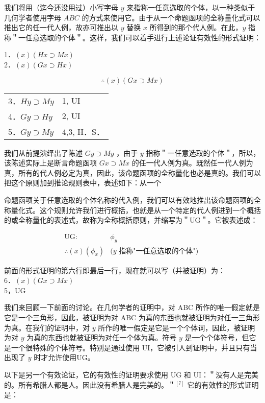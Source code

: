 我们将用（迄今还没用过）小写字母 $y$ 来指称一任意选取的个体，以一种类似于几何学者使用字母 $A B C$ 的方式来使用它。由于从一个命题函项的全称量化式可以推出它的任一代人例，故亦可推出以 $y$ 替换 $x$ 所得到的那个代人例。在此，$y$ 指称＂一任意选取的个体＂。这样，我们可以着手进行上述论证有效性的形式证明：

1．$(x)(H x \supset M x)$\\
2．$(x)(G x \supset H x)$

$$
\therefore(x)(G x \supset M x)
$$

\begin{center}
\begin{tabular}{ll}
3．$H y \supset M y$ & 1, UI \\
4．$G y \supset H y$ & 2, UI \\
5．$G y \supset M y$ & 4,3, H．S． \\
\end{tabular}
\end{center}

我们从前提演绎出了陈述 $G y \supset M y$ ，由于 $y$ 指称＂一任意选取的个体＂，所以，该陈述实际上是断言命题函项 $G x \supset M x$ 的任一代人例为真。既然任一代人例为真，所有的代人例必定为真，因此，该命题函项的全称量化也必是真的。我们可以把这个原则加到推论规则表中，表述如下：从一个

命题函项关于任意选取的个体名称的代入例，我们可以有效地推出该命题函项的全称量化式。这个规则允许我们进行概括，也就是从一个特定的代人例进到一个概括的或全称量化的表述式，故称为全称概括原则，并缩写为＂UG＂。它被表述成：

$$
\begin{aligned}
\mathrm{UG}: & \phi_{y} \\
\therefore(x)\left(\phi_{x}\right) & (y \text { 指称"一任意选取的个体") }
\end{aligned}
$$

前面的形式证明的第六行即最后一行，现在就可以写（并被证明）为：\\
6．$(x)(G x \supset M x)$\\
5，UG

我们来回顾一下前面的讨论。在几何学者的证明中，对 ABC 所作的唯一假定就是它是一个三角形，因此，被证明为对 ABC 为真的东西也就被证明为对任一三角形为真。在我们的证明中，对 $y$ 所作的唯一假定是它是一个个体词，因此，被证明为对 $y$ 为真的东西也就被证明为对任一个体为真。符号 $y$ 是一个个体符号，但它是一个很特殊的个体符号。特别是通过使用 UI，它被引人到证明中，并且只有当出现了 $y$ 时才允许使用UG。

以下是另一个有效论证，它的有效性的证明要求使用 UG 和 UI：＂没有人是完美的。所有希腊人都是人。因此没有希腊人是完美的。＂${ }^{[7]}$ 它的有效性的形式证明是：

